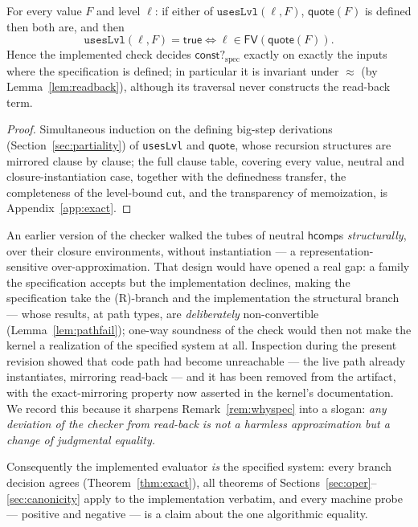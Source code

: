 \documentclass{lmcs}
\newcommand{\hcomp}{\mathsf{hcomp}}
\newcommand{\FV}{\mathsf{FV}}
\newcommand{\repeq}{\approx}
\newcommand{\constspec}{\mathsf{const?}_{\mathrm{spec}}}
\newcommand{\quo}{\mathsf{quote}}
\begin{document}
\begin{thm}\label{thm:exact}
  For every value $F$ and level $\ell$: if either of
  $\texttt{usesLvl}(\ell, F)$, $\quo(F)$ is defined then both are,
  and then
  \[
    \texttt{usesLvl}(\ell, F) = \mathsf{true}
    \iff \ell \in \FV(\quo(F)).
  \]
  Hence the implemented check decides $\constspec$ exactly on
  exactly the inputs where the specification is defined; in
  particular it is invariant under $\repeq$
  (by Lemma~\ref{lem:readback}), although its traversal never
  constructs the read-back term.
\end{thm}
\begin{proof}
  Simultaneous induction on the defining big-step derivations
  (Section~\ref{sec:partiality}) of \texttt{usesLvl} and $\quo$,
  whose recursion structures are mirrored clause by clause; the full
  clause table, covering every value, neutral and
  closure-instantiation case, together with the definedness
  transfer, the completeness of the level-bound cut, and the
  transparency of memoization, is Appendix~\ref{app:exact}.
\end{proof}

\begin{rem}\label{rem:archaeology}
  An earlier version of the checker walked the tubes of neutral
  $\hcomp$s \emph{structurally}, over their closure environments,
  without instantiation --- a representation-sensitive
  over-approximation.  That design would have opened a real gap:
  a family the specification accepts but the implementation
  declines, making the specification take the (R)-branch and the
  implementation the structural branch --- whose results, at path
  types, are \emph{deliberately} non-convertible
  (Lemma~\ref{lem:pathfail}); one-way soundness of the check would
  then not make the kernel a realization of the specified system at
  all.  Inspection during the present revision showed that code path
  had become unreachable --- the live path already instantiates,
  mirroring read-back --- and it has been removed from the artifact,
  with the exact-mirroring property now asserted in the kernel's
  documentation.  We record this because it sharpens
  Remark~\ref{rem:whyspec} into a slogan: \emph{any deviation of the
  checker from read-back is not a harmless approximation but a
  change of judgmental equality.}
\end{rem}

\noindent Consequently the implemented evaluator \emph{is} the
specified system: every branch decision agrees
(Theorem~\ref{thm:exact}), all theorems of
Sections~\ref{sec:oper}--\ref{sec:canonicity} apply to the
implementation verbatim, and every machine probe --- positive and
negative --- is a claim about the one algorithmic equality.
\end{document}

